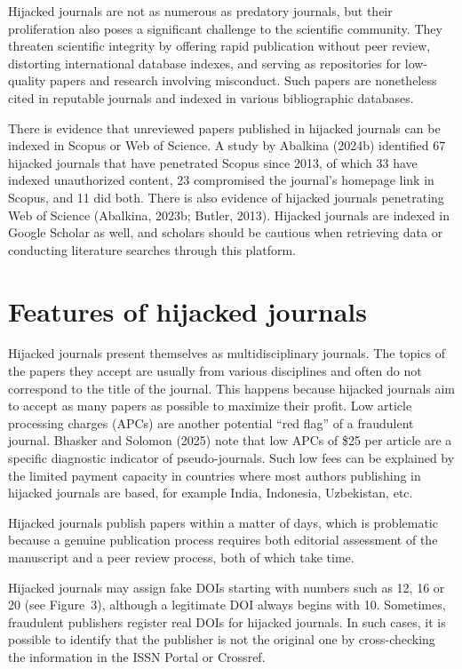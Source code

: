 \documentclass[a4paper,
fontsize=11pt,
oneside,
numbers=noperiodatend,
parskip=half-,
bibliography=totoc,
final
]{scrartcl}
\begin{document}
Hijacked journals are not as numerous as predatory journals, but their
proliferation also poses a significant challenge to the scientific
community. They threaten scientific integrity by offering rapid
publication without peer review, distorting international database
indexes, and serving as repositories for low-quality papers and research
involving misconduct. Such papers are nonetheless cited in reputable
journals and indexed in various bibliographic databases.

There is evidence that unreviewed papers published in hijacked journals
can be indexed in Scopus or Web of Science. A study by Abalkina (2024b)
identified 67 hijacked journals that have penetrated Scopus since 2013,
of which 33 have indexed unauthorized content, 23 compromised the
journal's homepage link in Scopus, and 11 did both. There is also
evidence of hijacked journals penetrating Web of Science (Abalkina,
2023b; Butler, 2013). Hijacked journals are indexed in Google Scholar as
well, and scholars should be cautious when retrieving data or conducting
literature searches through this platform.

\section{Features of hijacked
journals}\label{features-of-hijacked-journals}

Hijacked journals present themselves as multidisciplinary journals. The
topics of the papers they accept are usually from various disciplines
and often do not correspond to the title of the journal. This happens
because hijacked journals aim to accept as many papers as possible to
maximize their profit. Low article processing charges (APCs) are another
potential \enquote{red flag} of a fraudulent journal. Bhasker and
Solomon (2025) note that low APCs of \$25 per article are a specific
diagnostic indicator of pseudo-journals. Such low fees can be explained
by the limited payment capacity in countries where most authors
publishing in hijacked journals are based, for example India, Indonesia,
Uzbekistan, etc.

Hijacked journals publish papers within a matter of days, which is
problematic because a genuine publication process requires both
editorial assessment of the manuscript and a peer review process, both
of which take time.

Hijacked journals may assign fake DOIs starting with numbers such as 12,
16 or 20 (see Figure~3), although a legitimate DOI always begins with
10. Sometimes, fraudulent publishers register real DOIs for hijacked
journals. In such cases, it is possible to identify that the publisher
is not the original one by cross-checking the information in the ISSN
Portal or Crossref.
\end{document}
